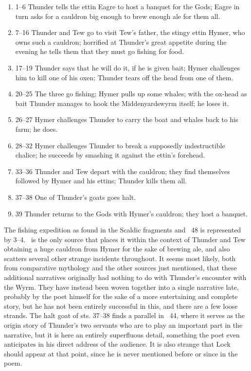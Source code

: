 \begin{enumerate}
  \item 1–6 Thunder tells the ettin Eagre to host a banquet for the Gods; Eagre in turn asks for a cauldron big enough to brew enough ale for them all.
  \item 7–16 Thunder and Tew go to visit Tew’s father, the stingy ettin Hymer, who owns such a cauldron; horrified at Thunder’s great appetite during the evening he tells them that they must go fishing for food.
  \item 17–19 Thunder says that he will do it, if he is given bait; Hymer challenges him to kill one of his oxen; Thunder tears off the head from one of them.
  \item 20–25 The three go fishing; Hymer pulls up some whales; with the ox-head as bait Thunder manages to hook the Middenyardswyrm itself; he loses it.
  \item 26–27 Hymer challenges Thunder to carry the boat and whales back to his farm; he does.
  \item 28–32 Hymer challenges Thunder to break a supposedly indestructible chalice; he succeeds by smashing it against the ettin’s forehead.
  \item 33–36 Thunder and Tew depart with the cauldron; they find themselves followed by Hymer and his ettins; Thunder kills them all.
  \item 37–38 One of Thunder’s goats goes halt.
  \item 39 Thunder returns to the Gods with Hymer’s cauldron; they host a banquet.
\end{enumerate}

The fishing expedition as found in the Scaldic fragments and \Gylfaginning\ 48 is represented by 3–4.  \Hymiskvida\ is the only source that places it within the context of Thunder and Tew obtaining a huge cauldron from Hymer for the sake of brewing ale, and also scatters several other strange incidents throughout.  It seems most likely, both from comparative mythology and the other sources just mentioned, that these additional narratives originally had nothing to do with Thunder’s encounter with the Wyrm.  They have instead been woven together into a single narrative late, probably by the poet himself for the sake of a more entertaining and complete story, but he has not been entirely successful in this, and there are a few loose strands.  The halt goat of sts. 37–38 finds a parallel in \Gylfaginning\ 44, where it serves as the origin story of Thunder’s two servants who are to play an important part in the narrative, but it is here an entirely superfluous detail, something the poet even anticipates in his direct address of the audience.  It is also strange that Lock should appear at that point, since he is never mentioned before or since in the poem.

